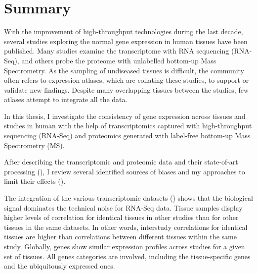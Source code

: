 \chapter*{Summary}\label{ch:summary}
\vspace{-1.2cm}
\begin{singlespace}
    {\small With the improvement of high-throughput technologies
    during the last decade,
    several studies exploring the normal gene expression in human tissues
    have been published.
    Many studies examine the transcriptome with RNA sequencing (RNA-Seq),
    and others probe the proteome with unlabelled bottom-up Mass Spectrometry.
    As the sampling of undiseased tissues is difficult,
    the community often refers to expression atlases,
    which are collating these studies,
    to support or validate new findings.
    Despite many overlapping tissues between the studies,
    few atlases attempt to integrate all the data.\mybr\

    \vspace{-1mm}
    In this thesis, I investigate the consistency of gene expression
    across tissues and studies in human
    with the help of transcriptomics
    captured with high-throughput sequencing (RNA-Seq)
    and proteomics generated with label-free bottom-up
    Mass Spectrometry (MS).\mybr\

    \vspace{-1mm}
    After describing the transcriptomic and proteomic data
    and their state-of-art processing (),
    I review several identified sources of biases
    and my approaches to limit their effects ().\mybr\

    \vspace{-1mm}
    The integration of the various transcriptomic datasets
    ()
    shows that
    the biological signal dominates the technical noise for RNA-Seq data.
    Tissue samples display higher levels of correlation
    for identical tissues in other studies than
    for other tissues in the same datasets.
    In other words, interstudy correlations for identical tissues
    are higher than correlations between different tissues within the same study.
    Globally, genes show similar expression profiles across studies
    for a given set of tissues.
    All genes categories are involved, including the tissue-specific genes
    and the ubiquitously expressed ones.\mybr\

}
\end{singlespace}
